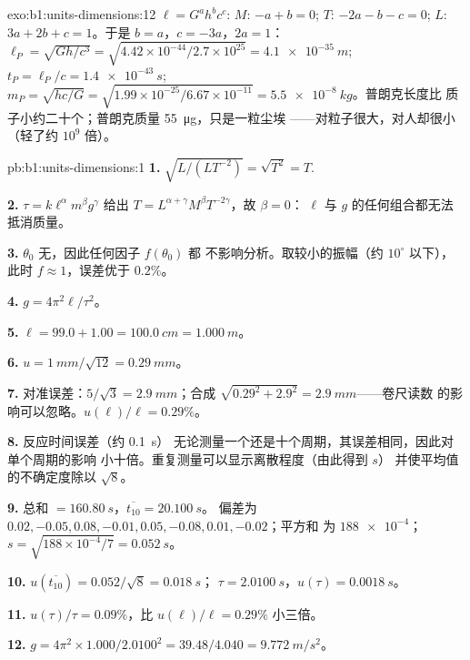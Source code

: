 \begin{solution}{exo:b1:units-dimensions:12}
$\ell = G^a h^b c^c$: $M$: $-a + b = 0$; $T$: $-2a - b - c = 0$; $L$:
$3a + 2b + c = 1$。于是 $b = a$，$c = -3a$，$2a = 1$：
$\ell_P = \sqrt{Gh/c^3} = \sqrt{4.42\times10^{-44}/2.7\times10^{25}}
= \qty{4.1e-35}{m}$; $t_P = \ell_P/c = \qty{1.4e-43}{s}$;
$m_P = \sqrt{hc/G} = \sqrt{1.99\times10^{-25}/6.67\times10^{-11}}
= \qty{5.5e-8}{kg}$。普朗克长度比
质子小约二十个；普朗克质量 \qty{55}{\micro g}，只是一粒尘埃
——对粒子很大，对人却很小（轻了约 $10^9$ 倍）。
\end{solution}

\begin{solution}{pb:b1:units-dimensions:1}
\textbf{1.} $\sqrt{L/(L T^{-2})} = \sqrt{T^2} = T$.

\textbf{2.} $\tau = k\ell^\alpha m^\beta g^\gamma$ 给出
$T = L^{\alpha+\gamma} M^\beta T^{-2\gamma}$，故 $\beta = 0$：
$\ell$ 与 $g$ 的任何组合都无法抵消质量。

\textbf{3.} $\theta_0$ 无，因此任何因子 $f(\theta_0)$ 都
不影响分析。取较小的振幅（约
$10^\circ$ 以下），此时 $f \approx 1$，误差优于 $0.2\%$。

\textbf{4.} $g = 4\pi^2\ell/\tau^2$。

\textbf{5.} $\ell = 99.0 + 1.00 = \qty{100.0}{cm} = \qty{1.000}{m}$。

\textbf{6.} $u = \qty{1}{mm}/\sqrt{12} = \qty{0.29}{mm}$。

\textbf{7.} 对准误差：$5/\sqrt3 = \qty{2.9}{mm}$；合成
$\sqrt{0.29^2 + 2.9^2} = \qty{2.9}{mm}$——卷尺读数
的影响可以忽略。$u(\ell)/\ell = 0.29\%$。

\textbf{8.} 反应时间误差（约 \qty{0.1}{s}）
无论测量一个还是十个周期，其误差相同，因此对单个周期的影响
小十倍。重复测量可以显示离散程度（由此得到 $s$）
并使平均值的不确定度除以 $\sqrt8$。

\textbf{9.} 总和 $= \qty{160.80}{s}$，$\overline{t_{10}} = \qty{20.100}{s}$。
偏差为 $0.02, -0.05, 0.08, -0.01, 0.05, -0.08, 0.01, -0.02$；平方和
为 $\num{188e-4}$；$s = \sqrt{188\times10^{-4}/7} = \qty{0.052}{s}$。

\textbf{10.} $u(\overline{t_{10}}) = 0.052/\sqrt8 = \qty{0.018}{s}$；
$\tau = \qty{2.0100}{s}$，$u(\tau) = \qty{0.0018}{s}$。

\textbf{11.} $u(\tau)/\tau = 0.09\%$，比
$u(\ell)/\ell = 0.29\%$ 小三倍。

\textbf{12.} $g = 4\pi^2 \times 1.000/2.0100^2 = 39.48/4.040 =
\qty{9.772}{m/s^2}$。


\end{solution}
